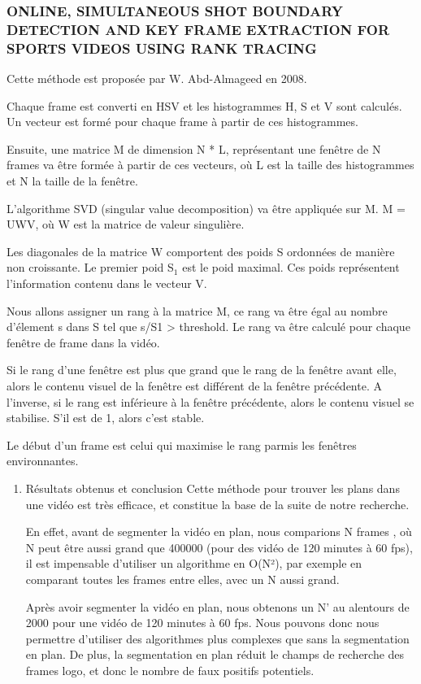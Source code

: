 \documentclass[11pt]{article}
\begin{document}
\subsubsection{ONLINE, SIMULTANEOUS SHOT BOUNDARY DETECTION AND KEY FRAME EXTRACTION FOR SPORTS VIDEOS USING RANK TRACING}
\label{sec-5-2-1}
Cette méthode est proposée par W. Abd-Almageed en 2008.

Chaque frame est converti en HSV et les histogrammes H, S et V sont calculés. 
Un vecteur est formé pour chaque frame à partir de ces histogrammes.

Ensuite, une matrice M de dimension N * L, représentant une fenêtre de N frames va
être formée à partir de ces vecteurs, où L est la taille des histogrammes et N la taille de la fenêtre.

L'algorithme SVD (singular value decomposition) va être appliquée sur M. M = UWV, 
où W est la matrice de valeur singulière. 

Les diagonales de la matrice W comportent des poids S ordonnées de manière non croissante. 
Le premier poid S$_{\text{1}}$ est le poid maximal. Ces poids représentent l'information contenu dans le vecteur V.

Nous allons assigner un rang à la matrice M,  ce rang va être égal au nombre d'élement s dans S 
tel que s/S1 > threshold. Le rang va être calculé pour chaque fenêtre de frame dans la vidéo. 

Si le rang d'une fenêtre est plus que grand que le rang de la fenêtre avant elle, alors le 
contenu visuel de la fenêtre est différent de la fenêtre précédente. 
A l'inverse, si le rang est inférieure à la fenêtre précédente, 
alors le contenu visuel se stabilise. S'il est de 1, alors c'est stable.

Le début d'un frame est celui qui maximise le rang parmis les fenêtres environnantes.

\begin{enumerate}
\item Résultats obtenus et conclusion
\label{sec-5-2-1-1}
Cette méthode pour trouver les plans dans une vidéo est très efficace, et constitue la
base de la suite de notre recherche. 

En effet, avant de segmenter la vidéo en plan, nous comparions  N frames , où N peut être 
aussi grand que 400000 (pour des vidéo de 120 minutes à 60 fps), il est impensable d’utiliser 
un algorithme en O(N²), par exemple en comparant toutes les frames entre elles, avec un N aussi grand.

Après avoir segmenter la vidéo en plan, nous obtenons un N’ au alentours de 2000 pour une vidéo
de 120 minutes à 60 fps. Nous pouvons donc nous permettre d’utiliser des algorithmes plus 
complexes que sans la segmentation en plan.
De plus, la segmentation en plan réduit le champs de recherche des frames logo, 
et donc le nombre de faux positifs potentiels.
\end{enumerate}
\end{document}
